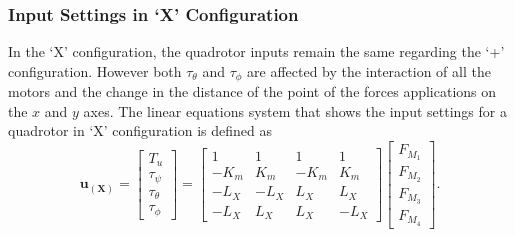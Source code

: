 \subsubsection{Input Settings in `X' Configuration}
In the `X' configuration, the quadrotor inputs remain the same regarding the `+' configuration. However both $\tau_\theta$ and $\tau_\phi$ are affected by the interaction of all the motors and the change in the distance of the point of the forces applications on the $x$ and $y$ axes. The linear equations system that shows the input settings for a quadrotor in `X' configuration is defined as
\begin{equation}
	\mathbf{u_{(X)}} = \begin{bmatrix}
	T_u\\[5pt]
	\tau_{\psi}\\[5pt]
	\tau_{\theta}\\[5pt]
	\tau_{\phi}
	\end{bmatrix} = \begin{bmatrix}
	1 & 1 & 1 & 1 \\[5pt]
	-K_{m} & K_{m} & -K_{m} & K_{m}\\[5pt]
	-L_{X} & -L_{X} & L_{X} & L_{X}\\[5pt]
	-L_{X} & L_{X} & L_{X} & -L_{X}
							\end{bmatrix}
\begin{bmatrix}
F_{M_1}\\[5pt]
F_{M_2}\\[5pt]
F_{M_3}\\[5pt]
F_{M_4}
\end{bmatrix}.
	\label{ec:U_X}						
\end{equation}

